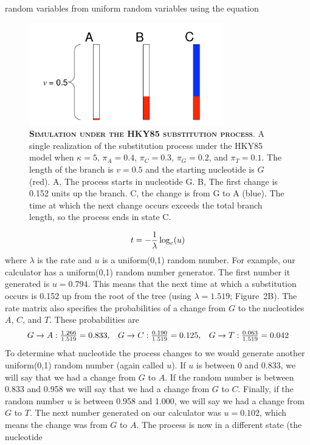 \documentclass{svmult}
\begin{document}
random variables from uniform random variables using the equation
\begin{figure}[t]
\centering
\includegraphics[height=1.75in]{fig2}
\caption{\textbf{\textsc{Simulation under the HKY85 substitution process}}.
A single realization of the substitution process under the HKY85 model when 
$\kappa = 5$, $\pi_A = 0.4$, $\pi_C = 0.3$, $\pi_G = 0.2$, and $\pi_T = 0.1$. The length of the branch
is $v = 0.5$ and the starting nucleotide is $G$ (red). A, The process starts in nucleotide G. B, The first change is 0.152
units up the branch. C, the change is from G to A (blue). The time at which the next change occurs exceeds the total
branch length, so the process ends in state C. }
\label{fig2}
\end{figure}
$$
t = -{1 \over \lambda} \log_e(u)
$$
where $\lambda$ is the rate and $u$ is a uniform(0,1) random number. For example, our calculator has a uniform(0,1) random number generator.
The first number it generated is $u = 0.794$. This means that the next time at which a substitution occurs is
0.152 up from the root of the tree (using $\lambda = 1.519$; Figure~2B). The rate matrix also specifies the probabilities of a change from $G$
to the nucleotides $A$, $C$, and $T$.  These probabilities are
$$
\begin{array}{ccc}
G \rightarrow A: {1.266\over 1.519}=0.833, &  G \rightarrow C: {0.190\over 1.519}=0.125, & G \rightarrow T: {0.063 \over 1.519}=0.042 \\
\end{array} 
$$
To determine what nucleotide the process changes to we would generate another uniform(0,1) random number (again
called $u$). If $u$ is between 0 and 0.833, we will say that we had a change from $G$ to $A$. If the random number
is between 0.833 and 0.958 we will say that we had a change from $G$ to $C$. Finally, if the random number $u$ is
between 0.958 and 1.000, we will say we had a change from $G$ to $T$. The next number generated on our calculator
was $u = 0.102$, which means the change was from $G$ to $A$. The process is now in a different state (the nucleotide
\end{document}
